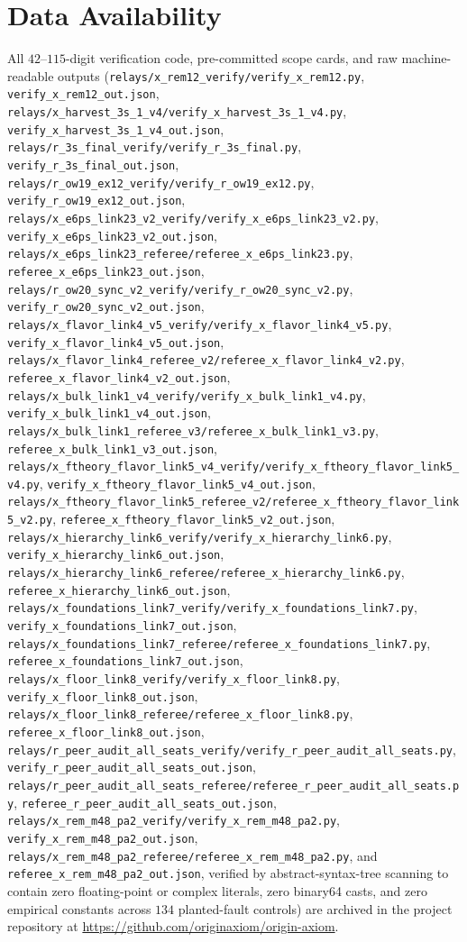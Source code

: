 \documentclass[aps,prd,twocolumn,nofootinbib,floatfix]{revtex4-2}
\begin{document}
\section*{Data Availability}

All $42$--$115$-digit verification code, pre-committed scope cards, and raw machine-readable outputs (\nolinkurl{relays/x_rem12_verify/verify_x_rem12.py}, \nolinkurl{verify_x_rem12_out.json}, \nolinkurl{relays/x_harvest_3s_1_v4/verify_x_harvest_3s_1_v4.py}, \nolinkurl{verify_x_harvest_3s_1_v4_out.json}, \nolinkurl{relays/r_3s_final_verify/verify_r_3s_final.py}, \nolinkurl{verify_r_3s_final_out.json}, \nolinkurl{relays/r_ow19_ex12_verify/verify_r_ow19_ex12.py}, \nolinkurl{verify_r_ow19_ex12_out.json}, \nolinkurl{relays/x_e6ps_link23_v2_verify/verify_x_e6ps_link23_v2.py}, \nolinkurl{verify_x_e6ps_link23_v2_out.json}, \nolinkurl{relays/x_e6ps_link23_referee/referee_x_e6ps_link23.py}, \nolinkurl{referee_x_e6ps_link23_out.json}, \nolinkurl{relays/r_ow20_sync_v2_verify/verify_r_ow20_sync_v2.py}, \nolinkurl{verify_r_ow20_sync_v2_out.json}, \nolinkurl{relays/x_flavor_link4_v5_verify/verify_x_flavor_link4_v5.py}, \nolinkurl{verify_x_flavor_link4_v5_out.json}, \nolinkurl{relays/x_flavor_link4_referee_v2/referee_x_flavor_link4_v2.py}, \nolinkurl{referee_x_flavor_link4_v2_out.json}, \nolinkurl{relays/x_bulk_link1_v4_verify/verify_x_bulk_link1_v4.py}, \nolinkurl{verify_x_bulk_link1_v4_out.json}, \nolinkurl{relays/x_bulk_link1_referee_v3/referee_x_bulk_link1_v3.py}, \nolinkurl{referee_x_bulk_link1_v3_out.json}, \nolinkurl{relays/x_ftheory_flavor_link5_v4_verify/verify_x_ftheory_flavor_link5_v4.py}, \nolinkurl{verify_x_ftheory_flavor_link5_v4_out.json}, \nolinkurl{relays/x_ftheory_flavor_link5_referee_v2/referee_x_ftheory_flavor_link5_v2.py}, \nolinkurl{referee_x_ftheory_flavor_link5_v2_out.json}, \nolinkurl{relays/x_hierarchy_link6_verify/verify_x_hierarchy_link6.py}, \nolinkurl{verify_x_hierarchy_link6_out.json}, \nolinkurl{relays/x_hierarchy_link6_referee/referee_x_hierarchy_link6.py}, \nolinkurl{referee_x_hierarchy_link6_out.json}, \nolinkurl{relays/x_foundations_link7_verify/verify_x_foundations_link7.py}, \nolinkurl{verify_x_foundations_link7_out.json}, \nolinkurl{relays/x_foundations_link7_referee/referee_x_foundations_link7.py}, \nolinkurl{referee_x_foundations_link7_out.json}, \nolinkurl{relays/x_floor_link8_verify/verify_x_floor_link8.py}, \nolinkurl{verify_x_floor_link8_out.json}, \nolinkurl{relays/x_floor_link8_referee/referee_x_floor_link8.py}, \nolinkurl{referee_x_floor_link8_out.json}, \nolinkurl{relays/r_peer_audit_all_seats_verify/verify_r_peer_audit_all_seats.py}, \nolinkurl{verify_r_peer_audit_all_seats_out.json}, \nolinkurl{relays/r_peer_audit_all_seats_referee/referee_r_peer_audit_all_seats.py}, \nolinkurl{referee_r_peer_audit_all_seats_out.json}, \nolinkurl{relays/x_rem_m48_pa2_verify/verify_x_rem_m48_pa2.py}, \nolinkurl{verify_x_rem_m48_pa2_out.json}, \nolinkurl{relays/x_rem_m48_pa2_referee/referee_x_rem_m48_pa2.py}, and \nolinkurl{referee_x_rem_m48_pa2_out.json}, verified by abstract-syntax-tree scanning to contain zero floating-point or complex literals, zero binary64 casts, and zero empirical constants across $134$ planted-fault controls) are archived in the project repository at \url{https://github.com/originaxiom/origin-axiom}.
\end{document}
